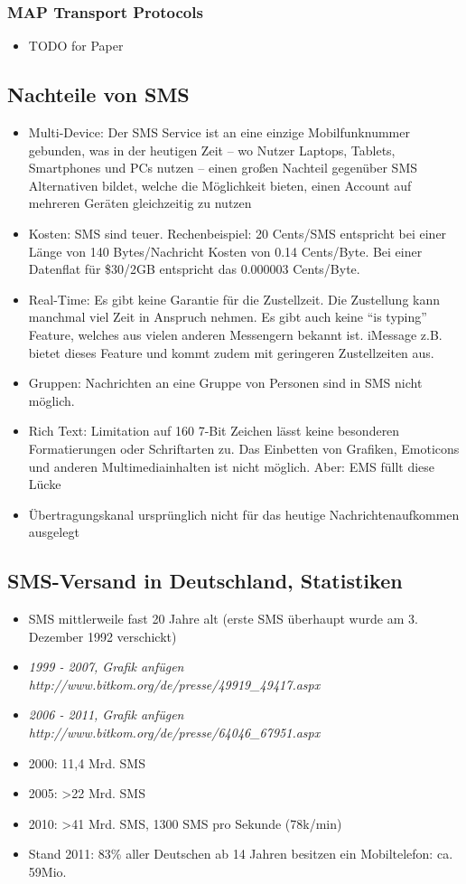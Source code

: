 \documentclass[german,12pt,a4paper]{article}
\begin{document}
\subsubsection{MAP Transport Protocols}
\begin{itemize}
	\item TODO for Paper
\end{itemize}

\subsection{Nachteile von SMS}
\begin{itemize}
	\item Multi-Device: Der SMS Service ist an eine einzige Mobilfunknummer gebunden, was in der heutigen Zeit -- 
		wo Nutzer Laptops, Tablets, Smartphones und PCs nutzen -- einen großen Nachteil gegenüber SMS Alternativen 
		bildet, welche die Möglichkeit bieten, einen Account auf mehreren Geräten gleichzeitig zu nutzen
	\item Kosten: SMS sind teuer. Rechenbeispiel: 20 Cents/SMS entspricht bei einer Länge von 140 Bytes/Nachricht Kosten 
		von 0.14 Cents/Byte. Bei einer Datenflat für \$30/2GB entspricht das 0.000003 Cents/Byte.
	\item Real-Time: Es gibt keine Garantie für die Zustellzeit. Die Zustellung kann manchmal viel Zeit in Anspruch nehmen. 
		Es gibt auch keine ``is typing'' Feature, welches aus vielen anderen Messengern bekannt ist. iMessage z.B. bietet 
		dieses Feature und kommt zudem mit geringeren Zustellzeiten aus.
	\item Gruppen: Nachrichten an eine Gruppe von Personen sind in SMS nicht möglich.
	\item Rich Text: Limitation auf 160 7-Bit Zeichen lässt keine besonderen Formatierungen oder Schriftarten zu. Das Einbetten
		von Grafiken, Emoticons und anderen Multimediainhalten ist nicht möglich. Aber: EMS füllt diese Lücke
	\item Übertragungskanal ursprünglich nicht für das heutige 
		Nachrichtenaufkommen ausgelegt
\end{itemize}

\subsection{SMS-Versand in Deutschland, Statistiken}
\begin{itemize}
	\item SMS mittlerweile fast 20 Jahre alt (erste SMS überhaupt wurde am 3. Dezember 1992 verschickt)
	\item \textit{1999 - 2007, Grafik anfügen http://www.bitkom.org/de/presse/49919\_49417.aspx}
	\item \textit{2006 - 2011, Grafik anfügen http://www.bitkom.org/de/presse/64046\_67951.aspx}
	\item 2000: 11,4 Mrd. SMS
	\item 2005: \textgreater 22 Mrd. SMS
	\item 2010: \textgreater 41 Mrd. SMS, 1300 SMS pro Sekunde (78k/min)
	\item Stand 2011: 83\% aller Deutschen ab 14 Jahren besitzen ein Mobiltelefon: ca. 59Mio.
\end{itemize}
\end{document}
